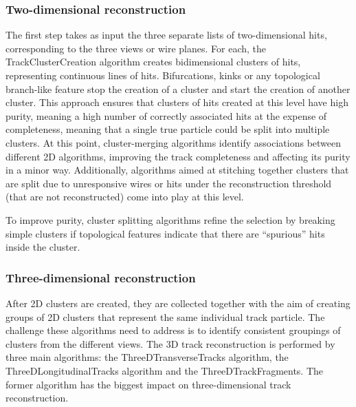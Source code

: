 \subsubsection{Two-dimensional reconstruction}

The first step takes as input the three separate lists of two-dimensional hits, corresponding to the three views or wire planes. For each, the TrackClusterCreation algorithm creates bidimensional clusters of hits, representing continuous lines of hits. Bifurcations, kinks or any topological branch-like feature stop the creation of a cluster and start the creation of another cluster. This approach ensures that clusters of hits created at this level have high purity, meaning a high number of correctly associated hits at the expense of completeness, meaning that a single true particle could be split into multiple clusters. At this point, cluster-merging algorithms identify associations between different 2D algorithms, improving the track completeness and affecting its purity in a minor way. Additionally, algorithms aimed at stitching together clusters that are split due to unresponsive wires or hits under the reconstruction threshold (that are not reconstructed) come into play at this level. 

To improve purity, cluster splitting algorithms refine the selection by breaking simple clusters if topological features indicate that there are ``spurious'' hits inside the cluster. 

\subsubsection{Three-dimensional reconstruction}

After 2D clusters are created, they are collected together with the aim of creating groups of 2D clusters that represent the same individual track particle. The challenge these algorithms need to address is to identify consistent groupings of clusters from the different views. The 3D track reconstruction is performed by three main algorithms: the ThreeDTransverseTracks algorithm, the ThreeDLongitudinalTracks algorithm and the ThreeDTrackFragments. The former algorithm has the biggest impact on three-dimensional track reconstruction.

